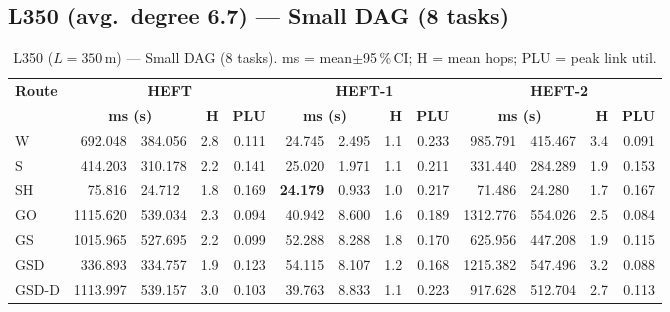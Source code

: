\documentclass[11pt]{article}
\newcommand{\win}[1]{\textcolor{green!50!black}{\textbf{#1}}}
\newcommand{\bad}[1]{\textcolor{red!70!black}{#1}}
\begin{document}
\subsection{L350 (avg.\ degree 6.7) --- Small DAG (8 tasks)}
\begin{table}[H]\centering\small
\begin{tabular}{l r@{$\pm$}l r r r@{$\pm$}l r r r@{$\pm$}l r r}
\toprule
\textbf{Route} & \multicolumn{4}{c}{\textbf{HEFT}} & \multicolumn{4}{c}{\textbf{HEFT-1}} & \multicolumn{4}{c}{\textbf{HEFT-2}} \\
\cmidrule(lr){2-5}\cmidrule(lr){6-9}\cmidrule(lr){10-13}
& \multicolumn{2}{c}{\textbf{ms (s)}} & \textbf{H} & \textbf{PLU}& \multicolumn{2}{c}{\textbf{ms (s)}} & \textbf{H} & \textbf{PLU}& \multicolumn{2}{c}{\textbf{ms (s)}} & \textbf{H} & \textbf{PLU} \\
\midrule
  W & 692.048 & 384.056 & 2.8 & 0.111 & 24.745 & 2.495 & 1.1 & 0.233 & 985.791 & 415.467 & 3.4 & 0.091 \\
  S & 414.203 & 310.178 & 2.2 & 0.141 & 25.020 & 1.971 & 1.1 & 0.211 & 331.440 & 284.289 & 1.9 & 0.153 \\
  SH & 75.816 & 24.712 & 1.8 & 0.169 & \win{24.179} & 0.933 & 1.0 & 0.217 & 71.486 & 24.280 & 1.7 & 0.167 \\
  GO & \bad{1115.620} & 539.034 & 2.3 & 0.094 & 40.942 & 8.600 & 1.6 & 0.189 & \bad{1312.776} & 554.026 & 2.5 & 0.084 \\
  GS & 1015.965 & 527.695 & 2.2 & 0.099 & 52.288 & 8.288 & 1.8 & 0.170 & 625.956 & 447.208 & 1.9 & 0.115 \\
  GSD & 336.893 & 334.757 & 1.9 & 0.123 & \bad{54.115} & 8.107 & 1.2 & 0.168 & 1215.382 & 547.496 & 3.2 & 0.088 \\
  GSD-D & 1113.997 & 539.157 & 3.0 & 0.103 & 39.763 & 8.833 & 1.1 & 0.223 & 917.628 & 512.704 & 2.7 & 0.113 \\
\bottomrule\end{tabular}
\caption{L350 ($L=350$\,m) --- Small DAG (8 tasks). ms = mean$\pm$95\,\%\,CI; H = mean hops; PLU = peak link util.}
\end{table}
\end{document}
